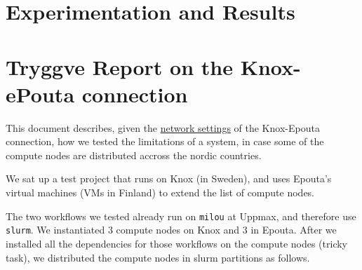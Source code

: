 \section{Experimentation and Results}
\label{section:results}
\label{section:experiments}

\section{Tryggve Report on the Knox-ePouta
connection}\label{tryggve-report-on-the-knox-epouta-connection}

This document describes, given the \href{./docs.md}{network settings} of
the Knox-Epouta connection, how we tested the limitations of a system,
in case some of the compute nodes are distributed accross the nordic
countries.

We sat up a test project that runs on Knox (in Sweden), and uses
Epouta's virtual machines (VMs in Finland) to extend the list of compute
nodes.

The two workflows we tested already run on \texttt{milou} at Uppmax, and
therefore use \texttt{slurm}. We instantiated 3 compute nodes on Knox
and 3 in Epouta. After we installed all the dependencies for those
workflows on the compute nodes (tricky task), we distributed the compute
nodes in slurm partitions as follows.

